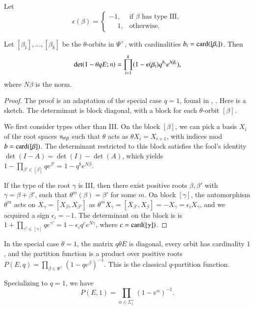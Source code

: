 Let
\[
\epsilon(\beta)=\begin{cases} -1, & \text{if $\beta$ has type III},\\
     \phantom{-}1, & \text{otherwise}.
\end{cases}
\]


\begin{lemma} \label{eqn:weyl-product}
Let $[\beta_1],\ldots,[\beta_k]$ be the $\theta$-orbits in $\Psi^+$, with cardinalities $b_i = {\operatorname{card}}([\beta_i])$.
Then
\[
\det(1-\theta  q E;{\mathfrak n}) = \prod_{i=1}^k (1- \epsilon(\beta_i) q^{b_i} e^{N\beta_i}),
\]
where 
$N\beta$ is the norm.
\end{lemma}

\begin{proof} The proof is an adaptation  of the special case $q=1$, 
found in \cite{jantzen1977darstellungen}, \cite{wendt2001weyl}.  Here is a sketch.
The determinant is block diagonal, with a block for each $\theta$-orbit $[\beta]$.

We first consider types other than III.
On the block $[\beta]$, we can pick a basis $X_i$ of the
root spaces ${\mathfrak n}_{\theta^i\beta}$ such that $\theta$ acts as $\theta X_i = X_{i+1}$, with indices mod $b={\operatorname{card}}([\beta])$.
The determinant restricted  to this block satisfies the fool's identity $\det(I-A) = \det(I)-\det(A)$, which yields
$1- \prod_{\beta'\in [\beta]} {q e^{\beta'}} = 1- q^b e^{N \beta}$.

If the type of the root $\gamma$ is III, then
there exist positive 
roots $\beta,\beta'$ with $\gamma = \beta+\beta'$,
such that $\theta^m(\beta)=\beta'$ for some $m$.
On block $[\gamma]$, the automorphism $\theta^m$ acts on $X_\gamma = [X_\beta,X_{\beta'}]$ 
as $\theta^m X_\gamma = [X_{\beta'},X_\beta] = -X_\gamma =\epsilon_i X_\gamma$, 
and we acquired a sign $\epsilon_i=-1$.  
The determinant on the block is
is $1+\prod_{\gamma'\in [\gamma]} {q e^{\gamma'}} = 1-\epsilon_i q^c e^{N\gamma}$, where $c={\operatorname{card}}([\gamma])$.
\end{proof}


In the special case $\theta=1$, the matrix $q \theta E$ is diagonal, every orbit has cardinality $1$,
and the partition function
is a product over positive roots 
$P(E,q) = \prod_{\beta\in\Psi^+} (1- q e^\beta)^{-1}$.  This is the classical $q$-partition function.


\begin{corollary}\label{cor:prod1} Specializing to $q=1$, we have
\[
P(E,1) = \prod_{\alpha\in\Sigma^+_1} (1-e^{\alpha})^{-1}.
\]
\end{corollary}

